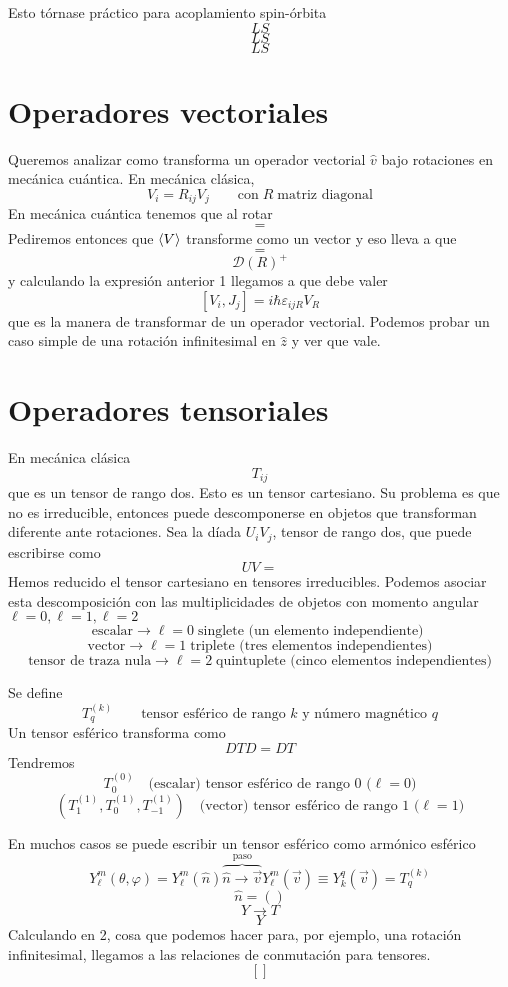 \documentclass[10pt,oneside]{CBFT_book}
\begin{document}
Esto tórnase práctico para acoplamiento spin-órbita 
\[
	LS
\]
\[
	LS
\]
\[
	LS
\]

\section{Operadores vectoriales}

Queremos analizar como transforma un operador vectorial $\hat{v}$ bajo rotaciones en mecánica cuántica.
En mecánica clásica,
\[
	V_i = R_{ij} V_j \qquad \text{con} \; R \; \text{matriz diagonal}
\]
En mecánica cuántica tenemos que al rotar
\[
	=
\]
Pediremos entonces que $\Braket{V}$ transforme como un vector y eso lleva a que 
\[
	=
\]
\[
	\mathcal{D}(R)^+
\]
y calculando la expresión anterior 1 llegamos a que debe valer
\[
	[V_i,J_j] =  i\hbar \varepsilon_{ijR}V_R
\]
que es la manera de transformar de un operador vectorial. Podemos probar un caso simple de una rotación 
infinitesimal 
en $\hat{z}$ y ver que vale.


\section{Operadores tensoriales}

En mecánica clásica 
\[
	T_{ij} 
\]
que es un tensor de rango dos. Esto es un tensor cartesiano. Su problema es que no es irreducible, entonces 
puede 
descomponerse en objetos que transforman diferente ante rotaciones. Sea la díada $U_iV_j$, tensor de rango 
dos, que 
puede escribirse como 
\[
	UV =
\]
Hemos reducido el tensor cartesiano en tensores irreducibles. Podemos asociar esta descomposición con las 
multiplicidades de objetos con momento angular $\ell=0, \ell=1, \ell=2$
\[
	\text{escalar} \longrightarrow \ell=0 \; \text{singlete (un elemento independiente) }
\]
\[
	\text{vector} \longrightarrow \ell=1 \; \text{triplete (tres elementos independientes)}
\]
\[
	\text{tensor de traza nula} \longrightarrow \ell=2 \; \text{quintuplete (cinco elementos 
independientes)}
\]

Se define 
\[
	T^{(k)}_q \qquad \text{tensor esférico de rango $k$ y número magnético $q$}
\]
Un tensor esférico transforma como 
\[
	D T D = D T 
\]
Tendremos 
\[
	T^{(0)}_0 \quad \text{(escalar) tensor esférico de rango 0 ($\ell=0$)}
\]
\[
	(T^{(1)}_1,T^{(1)}_0,T^{(1)}_{-1}) \quad \text{(vector) tensor esférico de rango 1 ($\ell=1$)}
\]

En muchos casos se puede escribir un tensor esférico como armónico esférico 
\[
	Y_\ell^{m}(\theta,\varphi) = Y_\ell^{m}(\hat{n})  \overbrace{\hat{n} \longrightarrow 
	\vec{v}}^{\text{paso}} Y_\ell^m(\vec{v}) \equiv Y_k^q(\vec{v}) = T_q^{(k)}
\]
\[
	\hat{n} = ()
\]
\[
	Y \longrightarrow T
\]
\[
	Y
\]
Calculando en 2, cosa que podemos hacer para, por ejemplo, una rotación infinitesimal, llegamos a las 
relaciones de conmutación para tensores.
\[
	[]
\]



\end{document}
